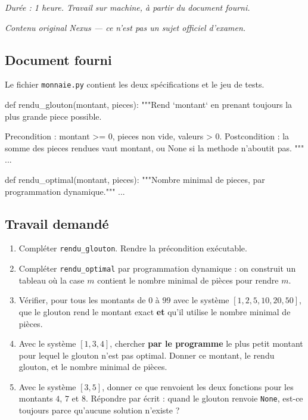 \textit{Durée : 1 heure. Travail sur machine, à partir du document fourni.}

\medskip
\textit{Contenu original Nexus --- ce n'est pas un sujet officiel d'examen.}

\subsection*{Document fourni}

Le fichier \lstinline{monnaie.py} contient les deux spécifications et le jeu de
tests.

\begin{python}
def rendu_glouton(montant, pieces):
    """Rend `montant` en prenant toujours la plus grande piece possible.

    Precondition  : montant >= 0, pieces non vide, valeurs > 0.
    Postcondition : la somme des pieces rendues vaut montant,
                    ou None si la methode n'aboutit pas.
    """
    ...

def rendu_optimal(montant, pieces):
    """Nombre minimal de pieces, par programmation dynamique."""
    ...
\end{python}

\subsection*{Travail demandé}

\begin{enumerate}
  \item Compléter \lstinline{rendu_glouton}. Rendre la précondition exécutable.

  \item Compléter \lstinline{rendu_optimal} par programmation dynamique : on
    construit un tableau où la case $m$ contient le nombre minimal de pièces
    pour rendre $m$.

  \item Vérifier, pour tous les montants de $0$ à $99$ avec le système
    $[1, 2, 5, 10, 20, 50]$, que le glouton rend le montant exact \textbf{et}
    qu'il utilise le nombre minimal de pièces.

  \item Avec le système $[1, 3, 4]$, chercher \textbf{par le programme} le plus
    petit montant pour lequel le glouton n'est pas optimal. Donner ce montant,
    le rendu glouton, et le nombre minimal de pièces.

  \item Avec le système $[3, 5]$, donner ce que renvoient les deux fonctions
    pour les montants $4$, $7$ et $8$. Répondre par écrit : quand le glouton
    renvoie \lstinline{None}, est-ce toujours parce qu'aucune solution
    n'existe ?
\end{enumerate}

